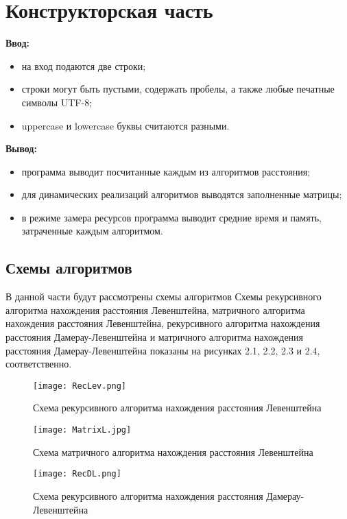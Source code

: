 \documentclass[12pt]{report}
\begin{document}
\chapter{Конструкторская часть}
\textbf{Ввод:}
\begin{itemize}
  	\item на вход подаются две строки;
  	\item строки могут быть пустыми, содержать пробелы, а также любые печатные символы UTF-8;
	\item uppercase и lowercase буквы считаются разными.
\end{itemize}
\textbf{Вывод:}
\begin{itemize}
  	\item программа выводит посчитанные каждым из алгоритмов расстояния;
  	\item для динамических реализаций алгоритмов выводятся заполненные матрицы;
  	\item в режиме замера ресурсов программа выводит средние время и память, затраченные каждым алгоритмом. 
\end{itemize}
\section{Схемы алгоритмов}
В данной части будут рассмотрены схемы алгоритмов Схемы рекурсивного алгоритма нахождения расстояния Левенштейна, матричного алгоритма нахождения расстояния Левенштейна, рекурсивного алгоритма нахождения расстояния Дамерау-Левенштейна и матричного алгоритма нахождения расстояния Дамерау-Левенштейна показаны на рисунках 2.1, 2.2, 2.3 и 2.4, соответственно.

\begin{figure}[h]
\centering
\texttt{[image: RecLev.png]}
\caption{Схема рекурсивного алгоритма нахождения расстояния Левенштейна}
\label{fig:mpr}
\end{figure}

\begin{figure}[h]
\centering
\texttt{[image: MatrixL.jpg]}
\caption{Схема матричного алгоритма нахождения расстояния Левенштейна}
\label{fig:mpr}
\end{figure}

\begin{figure}[h]
\centering
\texttt{[image: RecDL.png]}
\caption{Схема рекурсивного алгоритма нахождения расстояния Дамерау-Левенштейна}
\label{fig:mpr}
\end{figure}
\end{document}
